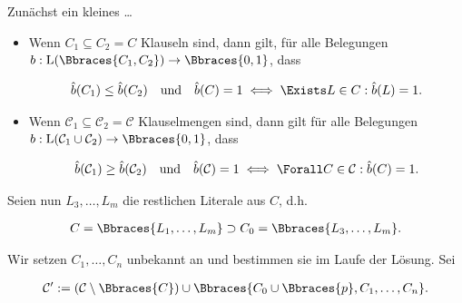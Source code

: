 \begin{solution}

Zunächst ein kleines \dots

\begin{lemma*}

    \phantom{}

    \begin{itemize}

        \item Wenn $C_1 \subseteq C_2 = C$ Klauseln sind, dann gilt, für alle Belegungen $b: \operatorname L(\Bbraces{C_1, C_2}) \to \Bbraces{0, 1}$, dass

        \begin{align*}
            \hat b(C_1) \leq \hat b(C_2)
            \quad
            \text{und}
            \quad
            \hat b(C) = 1
            \iff
            \Exists L \in C:
                \hat b(L) = 1.
        \end{align*}

        \item Wenn $\mathcal C_1 \subseteq \mathcal C_2 = \mathcal C$ Klauselmengen sind, dann gilt für alle Belegungen $b: \operatorname L(\mathcal C_1 \cup \mathcal C_2) \to \Bbraces{0, 1}$, dass

        \begin{align*}
            \hat b(\mathcal C_1) \geq \hat b(\mathcal C_2)
            \quad
            \text{und}
            \quad
            \hat b(\mathcal C) = 1
            \iff
            \Forall C \in \mathcal C:
                \hat b(C) = 1.
        \end{align*}

    \end{itemize}

\end{lemma*}

Seien nun $L_3, \dots, L_m$ die restlichen Literale aus $C$, d.h.

\begin{align*}
    C = \Bbraces{L_1, \dots, L_m}
    \supset
    C_0 = \Bbraces{L_3, \dots, L_m}.
\end{align*}

Wir setzen $C_1, \dots, C_n$ unbekannt an und bestimmen sie im Laufe der Lösung.
Sei

\begin{align*}
    \mathcal C^\prime
    :=
    (\mathcal C \setminus \Bbraces{C})
    \cup
    \Bbraces{C_0 \cup \Bbraces{p}, C_1, \dots, C_n}.
\end{align*}


\end{solution}
